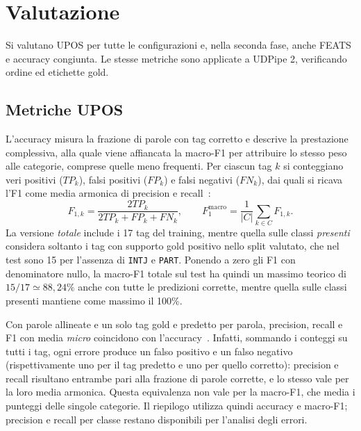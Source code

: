 \documentclass[12pt,a4paper]{report}
\begin{document}
\section{Valutazione}
\label{sec:method-evaluation}

Si valutano UPOS per tutte le configurazioni e, nella seconda fase, anche FEATS e accuracy congiunta. Le stesse metriche sono applicate a UDPipe 2, verificando ordine ed etichette gold.

\subsection{Metriche UPOS}
\label{subsec:method-upos-metrics}

L'accuracy misura la frazione di parole con tag corretto e descrive la prestazione complessiva, alla quale viene affiancata la macro-F1 per attribuire lo stesso peso alle categorie, comprese quelle meno frequenti. Per ciascun tag $k$ si conteggiano veri positivi ($TP_k$), falsi positivi ($FP_k$) e falsi negativi ($FN_k$), dai quali si ricava l'F1 come media armonica di precision e recall~\cite{sklearnmetrics}:
\begin{equation}
\label{eq:upos-macro-f1}
 F_{1,k}=\frac{2TP_k}{2TP_k+FP_k+FN_k},
 \qquad
 F_1^{\mathrm{macro}}=\frac{1}{|C|}\sum_{k\in C}F_{1,k}.
\end{equation}
La versione \emph{totale} include i 17 tag del training, mentre quella sulle classi \emph{presenti} considera soltanto i tag con supporto gold positivo nello split valutato, che nel test sono 15 per l'assenza di \texttt{INTJ} e \texttt{PART}. Ponendo a zero gli F1 con denominatore nullo, la macro-F1 totale sul test ha quindi un massimo teorico di $15/17 \simeq 88{,}24\%$ anche con tutte le predizioni corrette, mentre quella sulle classi presenti mantiene come massimo il 100\%.

Con parole allineate e un solo tag gold e predetto per parola, precision, recall e F1 con media \emph{micro} coincidono con l'accuracy~\cite{sklearnmetrics}. Infatti, sommando i conteggi su tutti i tag, ogni errore produce un falso positivo e un falso negativo (rispettivamente uno per il tag predetto e uno per quello corretto): precision e recall risultano entrambe pari alla frazione di parole corrette, e lo stesso vale per la loro media armonica. Questa equivalenza non vale per la macro-F1, che media i punteggi delle singole categorie. Il riepilogo utilizza quindi accuracy e macro-F1; precision e recall per classe restano disponibili per l'analisi degli errori.
\end{document}
